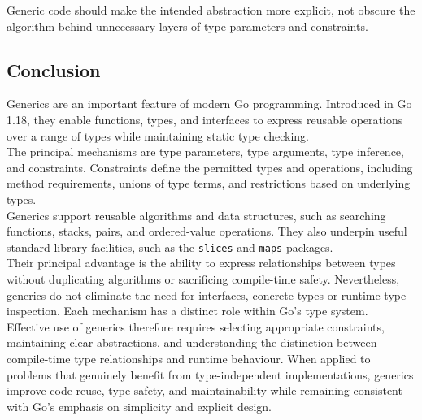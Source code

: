 Generic code should make the intended abstraction more explicit, not obscure the algorithm behind unnecessary layers of type parameters and constraints.

\subsection{Conclusion}

Generics are an important feature of modern Go programming. Introduced in Go 1.18, they enable functions, types, and interfaces to express reusable operations over a range of types while maintaining static type checking.\\

The principal mechanisms are type parameters, type arguments, type inference, and constraints. Constraints define the permitted types and operations, including method requirements, unions of type terms, and restrictions based on underlying types.\\

Generics support reusable algorithms and data structures, such as searching functions, stacks, pairs, and ordered-value operations. They also underpin useful standard-library facilities, such as the \texttt{slices} and \texttt{maps} packages.\\

Their principal advantage is the ability to express relationships between types without duplicating algorithms or sacrificing compile-time safety. Nevertheless, generics do not eliminate the need for interfaces, concrete types or runtime type inspection. Each mechanism has a distinct role within Go's type system.\\

Effective use of generics therefore requires selecting appropriate constraints, maintaining clear abstractions, and understanding the distinction between compile-time type relationships and runtime behaviour. When applied to problems that genuinely benefit from type-independent implementations, generics improve code reuse, type safety, and maintainability while remaining consistent with Go's emphasis on simplicity and explicit design.
